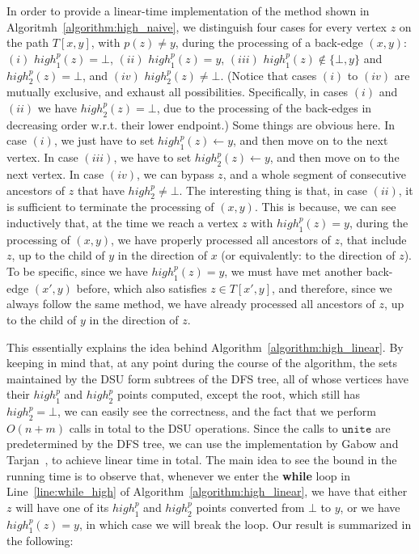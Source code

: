 \documentclass[11pt,a4paper]{article}
\begin{document}
In order to provide a linear-time implementation of the method shown in Algoritmh~\ref{algorithm:high_naive}, we distinguish four cases for every vertex $z$ on the path $T[x,y]$, with $p(z)\neq y$, during the processing of a back-edge $(x,y)$: $(i)$ $\mathit{high}^p_1(z)=\bot$, $(ii)$ $\mathit{high}^p_1(z)=y$, $(iii)$ $\mathit{high}^p_1(z)\notin\{\bot,y\}$ and $\mathit{high}^p_2(z)=\bot$, and $(iv)$ $\mathit{high}^p_2(z)\neq\bot$. (Notice that cases $(i)$ to $(iv)$ are mutually exclusive, and exhaust all possibilities. Specifically, in cases $(i)$ and $(ii)$ we have $\mathit{high}^p_2(z)=\bot$, due to the processing of the back-edges in decreasing order w.r.t. their lower endpoint.) Some things are obvious here. In case $(i)$, we just have to set $\mathit{high}^p_1(z)\leftarrow y$, and then move on to the next vertex. In case $(iii)$, we have to set $\mathit{high}^p_2(z)\leftarrow y$, and then move on to the next vertex. In case $(iv)$, we can bypass $z$, and a whole segment of consecutive ancestors of $z$ that have $\mathit{high}^p_2\neq\bot$. The interesting thing is that, in case $(ii)$, it is sufficient to terminate the processing of $(x,y)$. This is because, we can see inductively that, at the time we reach a vertex $z$ with $\mathit{high}^p_1(z)=y$, during the processing of $(x,y)$, we have properly processed all ancestors of $z$, that include $z$, up to the child of $y$ in the direction of $x$ (or equivalently: to the direction of $z$). To be specific, since we have $\mathit{high}^p_1(z)=y$, we must have met another back-edge $(x',y)$ before, which also satisfies $z\in T[x',y]$, and therefore, since we always follow the same method, we have already processed all ancestors of $z$, up to the child of $y$ in the direction of $z$.    



This essentially explains the idea behind Algorithm~\ref{algorithm:high_linear}. By keeping in mind that, at any point during the course of the algorithm, the sets maintained by the DSU form subtrees of the DFS tree, all of whose vertices have their $\mathit{high}^p_1$ and $\mathit{high}^p_2$ points computed, except the root, which still has $\mathit{high}^p_2=\bot$, we can easily see the correctness, and the fact that we perform $O(n+m)$ calls in total to the DSU operations. Since the calls to $\mathtt{unite}$ are predetermined by the DFS tree, we can use the implementation by Gabow and Tarjan~\cite{DBLP:journals/jcss/GabowT85}, to achieve linear time in total. The main idea to see the bound in the running time is to observe that, whenever we enter the \textbf{while} loop in Line~\ref{line:while_high} of Algorithm~\ref{algorithm:high_linear}, we have that either $z$ will have one of its $\mathit{high}^p_1$ and $\mathit{high}^p_2$ points converted from $\bot$ to $y$, or we have $\mathit{high}^p_1(z)=y$, in which case we will break the loop. Our result is summarized in the following:
\end{document}
